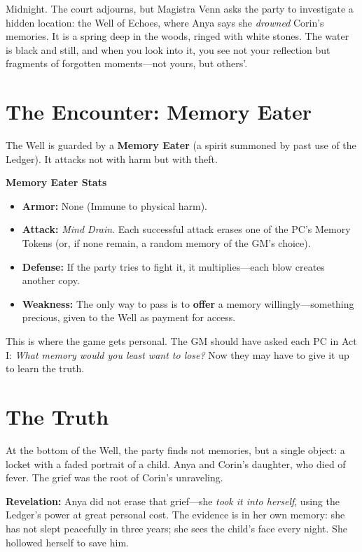 \documentclass[12pt]{book}
\begin{document}
Midnight. The court adjourns, but Magistra Venn asks the party to investigate a hidden location: the Well of Echoes, where Anya says she \textit{drowned} Corin's memories. It is a spring deep in the woods, ringed with white stones. The water is black and still, and when you look into it, you see not your reflection but fragments of forgotten moments---not yours, but others'.

\section{The Encounter: Memory Eater}

The Well is guarded by a \textbf{Memory Eater} (a spirit summoned by past use of the Ledger). It attacks not with harm but with theft.

\begin{infobox}
\textbf{Memory Eater Stats}
\begin{itemize}
    \item \textbf{Armor:} None (Immune to physical harm).
    \item \textbf{Attack:} \textit{Mind Drain}. Each successful attack erases one of the PC's Memory Tokens (or, if none remain, a random memory of the GM's choice).
    \item \textbf{Defense:} If the party tries to fight it, it multiplies---each blow creates another copy.
    \item \textbf{Weakness:} The only way to pass is to \textbf{offer} a memory willingly---something precious, given to the Well as payment for access.
\end{itemize}
\end{infobox}

This is where the game gets personal. The GM should have asked each PC in Act I: \textit{What memory would you least want to lose?} Now they may have to give it up to learn the truth.

\section{The Truth}

At the bottom of the Well, the party finds not memories, but a single object: a locket with a faded portrait of a child. Anya and Corin's daughter, who died of fever. The grief was the root of Corin's unraveling.

\textbf{Revelation:} Anya did not erase that grief---she \textit{took it into herself}, using the Ledger's power at great personal cost. The evidence is in her own memory: she has not slept peacefully in three years; she sees the child's face every night. She hollowed herself to save him.
\end{document}
